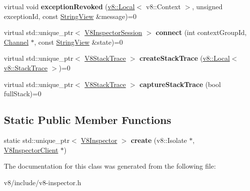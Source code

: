 \begin{DoxyCompactItemize}
\item 
\mbox{\label{classv8__inspector_1_1V8Inspector_a6853e6b53df0a0058b0e7ff2a3cc94ec}} 
virtual void {\bfseries exception\+Revoked} (\mbox{\hyperlink{classv8_1_1Local}{v8\+::\+Local}}$<$ v8\+::\+Context $>$, unsigned exception\+Id, const \mbox{\hyperlink{classv8__inspector_1_1StringView}{String\+View}} \&message)=0
\item 
\mbox{\label{classv8__inspector_1_1V8Inspector_ada36fa35ede4b3fda70b07fc855458e4}} 
virtual std\+::unique\+\_\+ptr$<$ \mbox{\hyperlink{classv8__inspector_1_1V8InspectorSession}{V8\+Inspector\+Session}} $>$ {\bfseries connect} (int context\+Group\+Id, \mbox{\hyperlink{classv8__inspector_1_1V8Inspector_1_1Channel}{Channel}} $\ast$, const \mbox{\hyperlink{classv8__inspector_1_1StringView}{String\+View}} \&state)=0
\item 
\mbox{\label{classv8__inspector_1_1V8Inspector_a4ac935e4871eef8ee5cb2e5ca41a2142}} 
virtual std\+::unique\+\_\+ptr$<$ \mbox{\hyperlink{classv8__inspector_1_1V8StackTrace}{V8\+Stack\+Trace}} $>$ {\bfseries create\+Stack\+Trace} (\mbox{\hyperlink{classv8_1_1Local}{v8\+::\+Local}}$<$ \mbox{\hyperlink{classv8_1_1StackTrace}{v8\+::\+Stack\+Trace}} $>$)=0
\item 
\mbox{\label{classv8__inspector_1_1V8Inspector_a22af900e1627ca8ef9382c0507645d70}} 
virtual std\+::unique\+\_\+ptr$<$ \mbox{\hyperlink{classv8__inspector_1_1V8StackTrace}{V8\+Stack\+Trace}} $>$ {\bfseries capture\+Stack\+Trace} (bool full\+Stack)=0
\end{DoxyCompactItemize}
\subsection*{Static Public Member Functions}
\begin{DoxyCompactItemize}
\item 
\mbox{\label{classv8__inspector_1_1V8Inspector_ac7b64842334aadde7dabff1ac6d82cff}} 
static std\+::unique\+\_\+ptr$<$ \mbox{\hyperlink{classv8__inspector_1_1V8Inspector}{V8\+Inspector}} $>$ {\bfseries create} (v8\+::\+Isolate $\ast$, \mbox{\hyperlink{classv8__inspector_1_1V8InspectorClient}{V8\+Inspector\+Client}} $\ast$)
\end{DoxyCompactItemize}


The documentation for this class was generated from the following file\+:\begin{DoxyCompactItemize}
\item 
v8/include/v8-\/inspector.\+h\end{DoxyCompactItemize}
